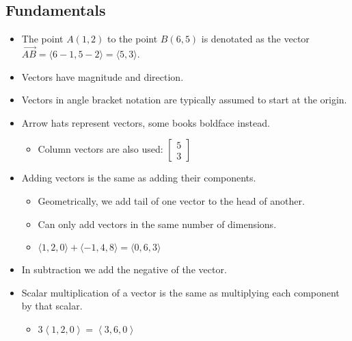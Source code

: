 \documentclass[12pt]{article}
\theoremstyle{plain} %
\theoremstyle{definition}
\theoremstyle{definition}
\theoremstyle{remark}
\newcommand{\angled}[1]{\left\langle {#1} \right\rangle}
\begin{document}
\subsection{Fundamentals}
\begin{itemize}
    \item The point $A(1,2)$ to the point $B(6,5)$ is denotated as the vector $\overrightarrow{AB} = \langle 6-1,5-2 \rangle = \langle 5,3 \rangle$.
    \item Vectors have magnitude and direction.
    \item Vectors in angle bracket notation are typically assumed to start at the origin.
    \item Arrow hats represent vectors, some books boldface instead.
    \begin{itemize}
        \item Column vectors are also used: $\begin{bmatrix} 5 \\ 3 \end{bmatrix}$
    \end{itemize}
    \item Adding vectors is the same as adding their components.
    \begin{itemize}
        \item Geometrically, we add tail of one vector to the head of another.
        \item Can only add vectors in the same number of dimensions.
        \item $\langle 1,2,0 \rangle + \langle -1,4,8 \rangle = \langle 0,6,3 \rangle$
    \end{itemize}
    \item In subtraction we add the negative of the vector.
    \item Scalar multiplication of a vector is the same as multiplying each component by that scalar.
    \begin{itemize}
        \item $3\angled{1,2,0} = \angled{3,6,0}$
    \end{itemize}
\end{itemize}
\end{document}
